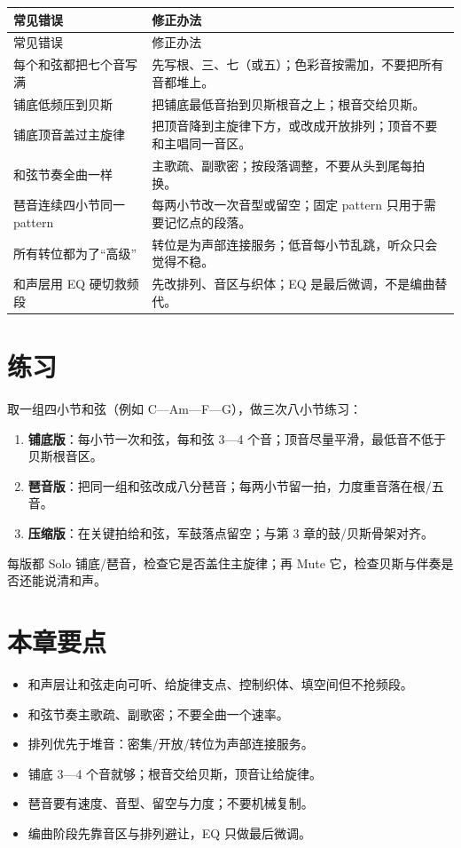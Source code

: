 \begin{longtable}{p{}p{}}
\toprule
常见错误 & 修正办法 \\
\midrule
\endfirsthead
\toprule
常见错误 & 修正办法 \\
\midrule
\endhead
每个和弦都把七个音写满 & 先写根、三、七（或五）；色彩音按需加，不要把所有音都堆上。 \\
铺底低频压到贝斯 & 把铺底最低音抬到贝斯根音之上；根音交给贝斯。 \\
铺底顶音盖过主旋律 & 把顶音降到主旋律下方，或改成开放排列；顶音不要和主唱同一音区。 \\
和弦节奏全曲一样 & 主歌疏、副歌密；按段落调整，不要从头到尾每拍换。 \\
琶音连续四小节同一 pattern & 每两小节改一次音型或留空；固定 pattern 只用于需要记忆点的段落。 \\
所有转位都为了“高级” & 转位是为声部连接服务；低音每小节乱跳，听众只会觉得不稳。 \\
和声层用 EQ 硬切救频段 & 先改排列、音区与织体；EQ 是最后微调，不是编曲替代。 \\
\bottomrule
\end{longtable}

\section{练习}
\label{sec:harmony-exercise}

\begin{exercise}
取一组四小节和弦（例如 C—Am—F—G），做三次八小节练习：
\begin{enumerate}
\item \textbf{铺底版}：每小节一次和弦，每和弦 3—4 个音；顶音尽量平滑，最低音不低于贝斯根音区。
\item \textbf{琶音版}：把同一组和弦改成八分琶音；每两小节留一拍，力度重音落在根/五音。
\item \textbf{压缩版}：在关键拍给和弦，军鼓落点留空；与第 3 章的鼓/贝斯骨架对齐。
\end{enumerate}
每版都 Solo 铺底/琶音，检查它是否盖住主旋律；再 Mute 它，检查贝斯与伴奏是否还能说清和声。
\end{exercise}

\section{本章要点}
\label{sec:harmony-takeaways}

\begin{itemize}
\item 和声层让和弦走向可听、给旋律支点、控制织体、填空间但不抢频段。
\item 和弦节奏主歌疏、副歌密；不要全曲一个速率。
\item 排列优先于堆音：密集/开放/转位为声部连接服务。
\item 铺底 3—4 个音就够；根音交给贝斯，顶音让给旋律。
\item 琶音要有速度、音型、留空与力度；不要机械复制。
\item 编曲阶段先靠音区与排列避让，EQ 只做最后微调。
\end{itemize}

